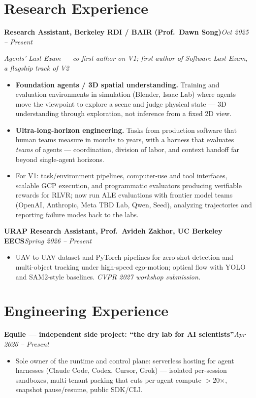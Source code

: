 \documentclass[9pt, letterpaper]{extarticle}
\newcommand{\role}[2]{%
  \vspace{2.5pt}%
  \noindent\textbf{#1}\hfill\textit{#2}\par\vspace{1pt}%
}
\newcommand{\rolesub}[1]{%
  \noindent\textit{#1}\par\vspace{1pt}%
}
\begin{document}
\section{Research Experience}

\role{Research Assistant, Berkeley RDI / BAIR (Prof.\ Dawn Song)}{Oct 2025 -- Present}
\rolesub{Agents' Last Exam --- co-first author on V1; first author of \emph{Software Last Exam}, a flagship track of V2}
\begin{itemize}
  \item \textbf{Foundation agents / 3D spatial understanding.} Training and evaluation environments in simulation (Blender, Isaac Lab) where agents move the viewpoint to explore a scene and judge physical state --- 3D understanding through exploration, not inference from a fixed 2D view.
  \item \textbf{Ultra-long-horizon engineering.} Tasks from production software that human teams measure in months to years, with a harness that evaluates \emph{teams} of agents --- coordination, division of labor, and context handoff far beyond single-agent horizons.
  \item For V1: task/environment pipelines, computer-use and tool interfaces, scalable GCP execution, and programmatic evaluators producing verifiable rewards for RLVR; now run ALE evaluations with frontier model teams (OpenAI, Anthropic, Meta TBD Lab, Qwen, Seed), analyzing trajectories and reporting failure modes back to the labs.
\end{itemize}

\role{URAP Research Assistant, Prof.\ Avideh Zakhor, UC Berkeley EECS}{Spring 2026 -- Present}
\begin{itemize}
  \item UAV-to-UAV dataset and PyTorch pipelines for zero-shot detection and multi-object tracking under high-speed ego-motion; optical flow with YOLO and SAM2-style baselines. \textit{CVPR 2027 workshop submission.}
\end{itemize}

\section{Engineering Experience}

\role{Equile --- independent side project: ``the dry lab for AI scientists''}{Apr 2026 -- Present}
\begin{itemize}
  \item Sole owner of the runtime and control plane: serverless hosting for agent harnesses (Claude Code, Codex, Cursor, Grok) --- isolated per-session sandboxes, multi-tenant packing that cuts per-agent compute $>$20$\times$, snapshot pause/resume, public SDK/CLI.
\end{itemize}
\end{document}
